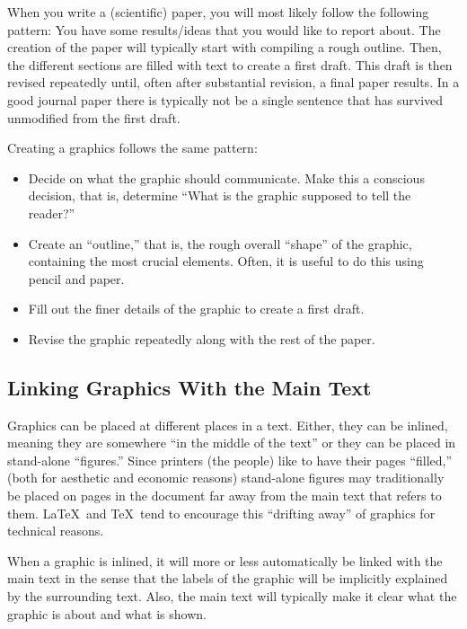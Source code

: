 When you write a (scientific) paper, you will most likely follow the following
pattern: You have some results/ideas that you would like to report about. The
creation of the paper will typically start with compiling a rough outline.
Then, the different sections are filled with text to create a first draft. This
draft is then revised repeatedly until, often after substantial revision, a
final paper results. In a good journal paper there is typically not be a single
sentence that has survived unmodified from the first draft.

Creating a graphics follows the same pattern:
%
\begin{itemize}
    \item Decide on what the graphic should communicate. Make this a
        conscious decision, that is, determine ``What is the graphic supposed
        to tell the reader?''
    \item Create an ``outline,'' that is, the rough overall ``shape'' of the
        graphic, containing the most crucial elements. Often, it is useful to
        do this using pencil and paper.
    \item Fill out the finer details of the graphic to create a first draft.
    \item Revise the graphic repeatedly along with the rest of the paper.
\end{itemize}


\subsection{Linking Graphics With the Main Text}

Graphics can be placed at different places in a text. Either, they can be
inlined, meaning they are somewhere ``in the middle of the text'' or they can
be placed in stand-alone ``figures.'' Since printers (the people) like to have
their pages ``filled,'' (both for aesthetic and economic reasons) stand-alone
figures may traditionally be placed on pages in the document far away from the
main text that refers to them. \LaTeX\ and \TeX\ tend to encourage this
``drifting away'' of graphics for technical reasons.

When a graphic is inlined, it will more or less automatically be linked with
the main text in the sense that the labels of the graphic will be implicitly
explained by the surrounding text. Also, the main text will typically make it
clear what the graphic is about and what is shown.

